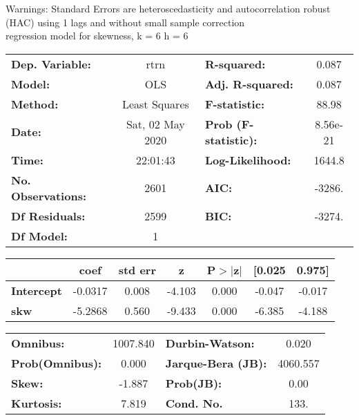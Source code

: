 Warnings: \newline
 [1] Standard Errors are heteroscedasticity and autocorrelation robust (HAC) using 1 lags and without small sample correction\\ 

regression model for skewness, k = 6 h = 6\begin{center}
\begin{tabular}{lclc}
\toprule
\textbf{Dep. Variable:}    &       rtrn       & \textbf{  R-squared:         } &     0.087   \\
\textbf{Model:}            &       OLS        & \textbf{  Adj. R-squared:    } &     0.087   \\
\textbf{Method:}           &  Least Squares   & \textbf{  F-statistic:       } &     88.98   \\
\textbf{Date:}             & Sat, 02 May 2020 & \textbf{  Prob (F-statistic):} &  8.56e-21   \\
\textbf{Time:}             &     22:01:43     & \textbf{  Log-Likelihood:    } &    1644.8   \\
\textbf{No. Observations:} &        2601      & \textbf{  AIC:               } &    -3286.   \\
\textbf{Df Residuals:}     &        2599      & \textbf{  BIC:               } &    -3274.   \\
\textbf{Df Model:}         &           1      & \textbf{                     } &             \\
\bottomrule
\end{tabular}
\begin{tabular}{lcccccc}
                   & \textbf{coef} & \textbf{std err} & \textbf{z} & \textbf{P$> |$z$|$} & \textbf{[0.025} & \textbf{0.975]}  \\
\midrule
\textbf{Intercept} &      -0.0317  &        0.008     &    -4.103  &         0.000        &       -0.047    &       -0.017     \\
\textbf{skw}       &      -5.2868  &        0.560     &    -9.433  &         0.000        &       -6.385    &       -4.188     \\
\bottomrule
\end{tabular}
\begin{tabular}{lclc}
\textbf{Omnibus:}       & 1007.840 & \textbf{  Durbin-Watson:     } &    0.020  \\
\textbf{Prob(Omnibus):} &   0.000  & \textbf{  Jarque-Bera (JB):  } & 4060.557  \\
\textbf{Skew:}          &  -1.887  & \textbf{  Prob(JB):          } &     0.00  \\
\textbf{Kurtosis:}      &   7.819  & \textbf{  Cond. No.          } &     133.  \\
\bottomrule
\end{tabular}
\end{center}

